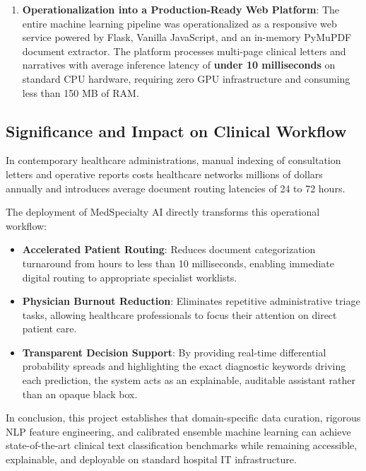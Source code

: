 \begin{enumerate}
    \item \textbf{Operationalization into a Production-Ready Web Platform}:
    The entire machine learning pipeline was operationalized as a responsive web service powered by Flask, Vanilla JavaScript, and an in-memory PyMuPDF document extractor. The platform processes multi-page clinical letters and narratives with average inference latency of \textbf{under 10 milliseconds} on standard CPU hardware, requiring zero GPU infrastructure and consuming less than 150 MB of RAM.
\end{enumerate}

\subsection{Significance and Impact on Clinical Workflow}

In contemporary healthcare administrations, manual indexing of consultation letters and operative reports costs healthcare networks millions of dollars annually and introduces average document routing latencies of 24 to 72 hours. 

The deployment of MedSpecialty AI directly transforms this operational workflow:
\begin{itemize}
    \item \textbf{Accelerated Patient Routing}: Reduces document categorization turnaround from hours to less than 10 milliseconds, enabling immediate digital routing to appropriate specialist worklists.
    \item \textbf{Physician Burnout Reduction}: Eliminates repetitive administrative triage tasks, allowing healthcare professionals to focus their attention on direct patient care.
    \item \textbf{Transparent Decision Support}: By providing real-time differential probability spreads and highlighting the exact diagnostic keywords driving each prediction, the system acts as an explainable, auditable assistant rather than an opaque black box.
\end{itemize}

In conclusion, this project establishes that domain-specific data curation, rigorous NLP feature engineering, and calibrated ensemble machine learning can achieve state-of-the-art clinical text classification benchmarks while remaining accessible, explainable, and deployable on standard hospital IT infrastructure.
